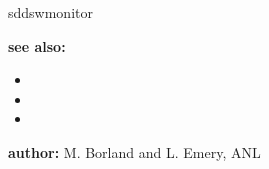 \begin{sddsprog}{sddswmonitor}
\item \textbf{see also:}
    \begin{itemize}
    \item {}
    \item {}
    \item {}
    \end{itemize}
\item \textbf{author:} M. Borland and L. Emery, ANL 
\end{sddsprog}
